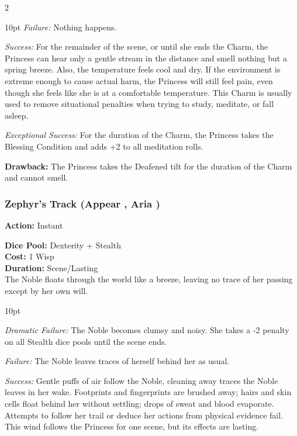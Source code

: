 \begin{multicols}{2}
\begin{myindentpar}{10pt}
    \emph{Failure:} Nothing happens. 

    \emph{Success:} For the remainder of the scene, or until she ends the Charm, the Princess can hear only a gentle stream in the distance and smell nothing but a spring breeze. Also, the temperature feels cool and dry. If the environment is extreme enough to cause actual harm, the Princess will still feel pain, even though she feels like she is at a comfortable temperature. This Charm is usually used to remove situational penalties when trying to study, meditate, or fall asleep.

    \emph{Exceptional Success:} For the duration of the Charm, the Princess takes the Blessing Condition and adds +2 to all meditation rolls. \end{myindentpar}

\noindent \textbf{Drawback:} The Princess takes the Deafened tilt for the duration of the Charm and cannot smell. 

\subsubsection*{Zephyr’s Track  (Appear \textbullet, Aria \textbullet )}

\noindent \textbf{Action:} Instant

\noindent \textbf{Dice Pool:} Dexterity + Stealth \\

\noindent \textbf{Cost:} 1 Wisp\\

\noindent \textbf{Duration:} Scene/Lasting \\

\noindent The Noble floats through the world like a breeze, leaving no trace of her passing except by her own will.

\begin{myindentpar}{10pt}

\emph{Dramatic Failure:} The Noble becomes clumsy and noisy. She takes a -2 penalty on all Stealth dice pools until the scene ends.

\emph{Failure:} The Noble leaves traces of herself behind her as usual.

\emph{Success:} Gentle puffs of air follow the Noble, cleaning away traces the Noble leaves in her wake. Footprints and fingerprints are brushed away; hairs and skin cells float behind her without settling; drops of sweat and blood evaporate. Attempts to follow her trail or deduce her actions from physical evidence fail. This wind follows the Princess for one scene, but its effects are lasting. 


\end{myindentpar}
\end{multicols}

